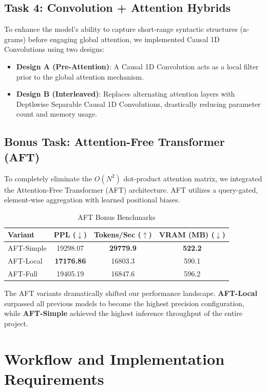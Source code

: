 \documentclass[11pt,a4paper]{article}
\begin{document}
\subsection{Task 4: Convolution + Attention Hybrids}
To enhance the model's ability to capture short-range syntactic structures (n-grams) before engaging global attention, we implemented Causal 1D Convolutions using two designs:
\begin{itemize}
    \item \textbf{Design A (Pre-Attention)}: A Causal 1D Convolution acts as a local filter prior to the global attention mechanism.
    \item \textbf{Design B (Interleaved)}: Replaces alternating attention layers with Depthwise Separable Causal 1D Convolutions, drastically reducing parameter count and memory usage.
\end{itemize}

\subsection{Bonus Task: Attention-Free Transformer (AFT)}
To completely eliminate the $O(N^2)$ dot-product attention matrix, we integrated the Attention-Free Transformer (AFT) architecture. AFT utilizes a query-gated, element-wise aggregation with learned positional biases.

\begin{table}[h]
    \centering
    \caption{AFT Bonus Benchmarks}
    \begin{tabular}{lccc}
        \toprule
        \textbf{Variant} & \textbf{PPL} ($\downarrow$) & \textbf{Tokens/Sec} ($\uparrow$) & \textbf{VRAM (MB)} ($\downarrow$) \\
        \midrule
        AFT-Simple & 19298.07 & \textbf{29779.9} & \textbf{522.2} \\
        AFT-Local  & \textbf{17176.86} & 16803.3 & 590.1 \\
        AFT-Full   & 19405.19 & 16847.6 & 596.2 \\
        \bottomrule
    \end{tabular}
    \label{tab:aft_benchmarks}
\end{table}

The AFT variants dramatically shifted our performance landscape. \textbf{AFT-Local} surpassed all previous models to become the highest precision configuration, while \textbf{AFT-Simple} achieved the highest inference throughput of the entire project.

\section{Workflow and Implementation Requirements}
\end{document}
